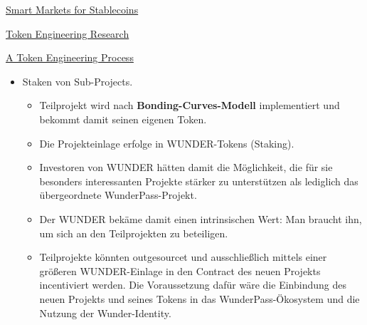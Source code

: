 
\vspace{0.5cm}

\href{http://cdetr.io/smart-markets/}{Smart Markets for Stablecoins}

\href{https://medium.com/crypto3conomics/token-engineering-research-b6627add09ee}{Token Engineering Research}

\href{https://medium.com/@stephen_yo/a-token-engineering-process-16687f3b9a74}{A Token Engineering Process}

\vspace{0.5cm}

\begin{itemize}
  \item Staken von Sub-Projects. 
  \begin{itemize}
  	\item Teilprojekt wird nach \textbf{Bonding-Curves-Modell} implementiert und bekommt damit seinen eigenen Token.
  	\item Die Projekteinlage erfolge in WUNDER-Tokens (Staking).
  	\item Investoren von WUNDER hätten damit die Möglichkeit, die für sie besonders interessanten Projekte stärker zu unterstützen als lediglich das übergeordnete WunderPass-Projekt.
  	\item Der WUNDER bekäme damit einen intrinsischen Wert: Man braucht ihn, um sich an den Teilprojekten zu beteiligen.
  	\item Teilprojekte könnten outgesourcet und ausschließlich mittels einer größeren WUNDER-Einlage in den Contract des neuen Projekts incentiviert werden. Die Voraussetzung dafür wäre die Einbindung des neuen Projekts und seines Tokens in das WunderPass-Ökosystem und die Nutzung der Wunder-Identity.
  \end{itemize}
\end{itemize}

\vspace{0.5cm}
